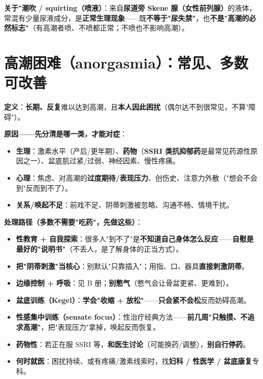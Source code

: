 \documentclass[12pt,UTF8,openany]{ctexbook}
\begin{document}
\noindent\textbf{关于"潮吹 / squirting（喷液）}：来自\textbf{尿道旁 Skene 腺（女性前列腺）}的液体，常混有少量尿液成分，是\textbf{正常生理现象}——既\textbf{不等于"尿失禁"}，也\textbf{不是"高潮的必然标志"}（有高潮者喷、不喷都正常；不喷也不影响高潮）。

\section{高潮困难（anorgasmia）：常见、多数可改善}

\textbf{定义}：\textbf{长期、反复}难以达到高潮，且\textbf{本人因此困扰}（偶尔达不到很常见，不算"障碍"）。

\textbf{原因——先分清是哪一类，才能对症}：
\begin{itemize}[leftmargin=2em,itemsep=0.3em]
  \item \textbf{生理}：激素水平（产后/更年期）、\textbf{药物}（\textbf{SSRI 类抗抑郁药}是最常见药源性原因之一）、盆底肌过紧/过弱、神经因素、慢性疼痛。
  \item \textbf{心理}：焦虑、对高潮的\textbf{过度期待/表现压力}、创伤史、注意力外散（"想会不会到"反而到不了）。
  \item \textbf{关系/唤起不足}：前戏不足、阴蒂刺激被忽略、沟通不畅、情境干扰。
\end{itemize}

\textbf{处理路径（多数不需要"吃药"，先做这些）}：
\begin{itemize}[leftmargin=2em,itemsep=0.3em]
  \item \textbf{性教育 + 自我探索}：很多人"到不了"是\textbf{不知道自己身体怎么反应}——\textbf{自慰是最好的"说明书"}（不丢人，是了解身体的正当方式）。
  \item \textbf{把"阴蒂刺激"当核心}：别默认"只靠插入"；用指、口、器具\textbf{直接刺激阴蒂}。
  \item \textbf{边缘控制 + 呼吸}：见 B 册；\textbf{别憋气}（憋气会让骨盆更紧、更难到）。
  \item \textbf{盆底训练（Kegel）}：\textbf{学会"收缩 + 放松"}——\textbf{只会紧不会松}反而妨碍高潮。
  \item \textbf{性感集中训练（sensate focus）}：性治疗经典方法——\textbf{前几周"只触摸、不追求高潮"}，把"表现压力"拿掉，唤起反而恢复。
  \item \textbf{药物性}：若正在服 SSRI 等，\textbf{和医生讨论}（可能换药/调整），\textbf{别自行停药}。
  \item \textbf{何时就医}：困扰持续、或有疼痛/激素线索时，找\textbf{妇科 / 性医学 / 盆底康复}专科。
\end{itemize}
\end{document}
